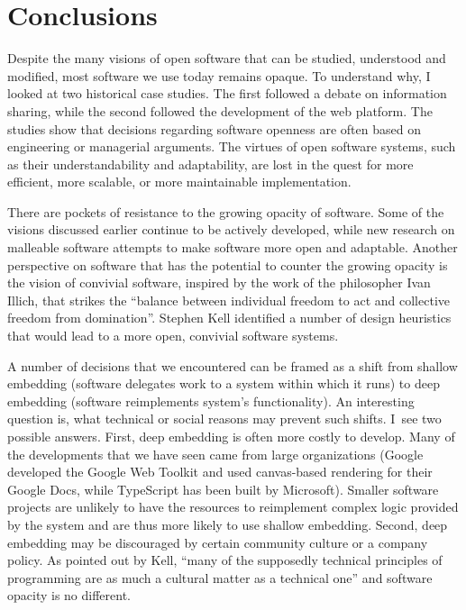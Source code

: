 \section{Conclusions}
Despite the many visions of open software that can be studied, understood and modified,
most software we use today remains opaque. To understand why, I looked at
two historical case studies. The first followed a debate on information sharing,
while the second followed the development of the web platform. The studies show that
decisions regarding software openness are often based on engineering
or managerial arguments. The virtues of open software systems, such as their understandability
and adaptability, are lost in the quest for more efficient, more scalable, or more
maintainable implementation.

There are pockets of resistance to the growing opacity of software. Some of the visions
discussed earlier continue to be actively developed,
while new research on malleable software attempts to make software more open and
adaptable. Another perspective on software that has the potential to counter the growing
opacity is the vision of convivial software, inspired by the work of the philosopher Ivan
Illich, that strikes the ``balance between individual
freedom to act and collective freedom from domination''.
Stephen Kell identified a number of design heuristics that would lead to a more open,
convivial software systems.

A number of decisions that we encountered can be framed as a shift
from shallow embedding (software delegates work to a system within which it
runs) to deep embedding (software reimplements system's functionality).
An interesting question is, what technical or social reasons may prevent such shifts.
I~see two possible answers. First, deep embedding is often more costly to develop.
Many of the developments that we have seen came from large organizations (Google developed
the Google Web Toolkit and used canvas-based rendering for their Google Docs, while
TypeScript has been built by Microsoft).
Smaller software projects are unlikely to have the resources to reimplement
complex logic provided by the system and are thus more likely to use shallow embedding.
Second, deep embedding may be discouraged by certain community culture or a company policy.
As pointed out by Kell,
``many of the supposedly technical principles of programming are as much a cultural matter
as a technical one'' and software opacity is no different.

